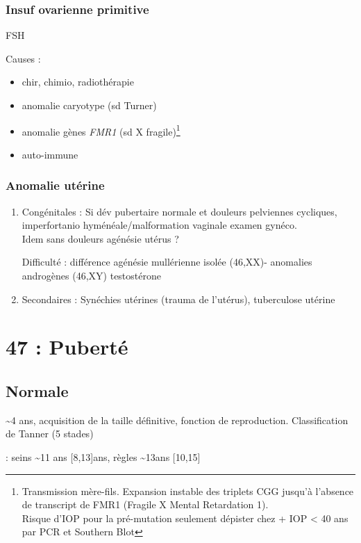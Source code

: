 \documentclass[11pt]{article}
\begin{document}
\subsubsection{Insuf ovarienne primitive}
\label{sec:orgcb324d5}
\inc FSH

Causes :
\begin{itemize}
\item chir, chimio, radiothérapie
\item anomalie caryotype (sd Turner)
\item anomalie gènes \emph{FMR1} (sd X fragile)\footnote{Transmission mère-fils. Expansion instable des triplets CGG jusqu'à
l'absence de transcript de FMR1 (Fragile X Mental Retardation 1). \\
\danger Risque d'IOP pour la pré-mutation seulement \thus dépister chez
\female + IOP < 40 ans par PCR et Southern Blot}
\item auto-immune
\end{itemize}
\subsubsection{Anomalie utérine}
\label{sec:orge8c29c8}
\begin{enumerate}
\item Congénitales :
\label{sec:orgebe3326}
Si dév pubertaire normale et douleurs pelviennes cycliques, imperfortanio
hyménéale/malformation vaginale \thus examen gynéco.\\
Idem sans douleurs \thus agénésie utérus ?

Difficulté : différence agénésie mullérienne isolée (46,XX)- anomalies androgènes
(46,XY) \thus testostérone
\item Secondaires :
\label{sec:orgd4386f3}
Synéchies utérines (trauma de l'utérus), tuberculose utérine
\end{enumerate}
\section{47 : Puberté}
\label{sec:org15bb310}
\subsection{Normale}
\label{sec:org45ba0c5}
\textasciitilde{}4 ans, acquisition de la taille définitive, fonction de
reproduction. Classification de Tanner (5 stades)

\female : seins \textasciitilde{}11 ans [8,13]ans, règles \textasciitilde{}13ans [10,15]
\end{document}
